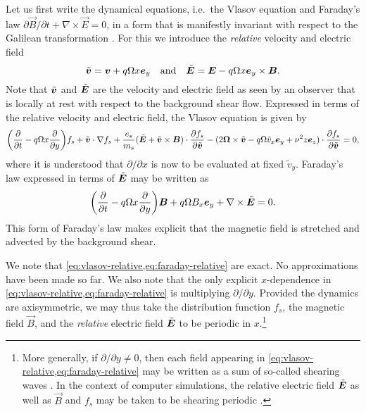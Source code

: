 \documentclass[aps,pre,notitlepage,amsmath,amssymb,amsfonts,nobibnotes,nofootinbib,superscriptaddress]{revtex4-1}
\begin{document}
Let us first write the dynamical equations, i.e.\ the Vlasov equation
 and Faraday's law
$\partial\vec{B}/\partial{}t+\nabla\times\vec{E}=0$, in a form that is
manifestly invariant with respect to the Galilean transformation
. For this we introduce the \emph{relative}
velocity and electric field
\begin{equation}
  \label{eq:relative-quantities}
  \tvec{v} = \vec{v} + q\Omega x\ey
  \quad\textrm{and}\quad
  \tvec{E} = \vec{E} - q\Omega x\ey\times\vec{B}.
\end{equation}
Note that $\tilde{\bm{v}}$ and $\tilde{\bm{E}}$ are the velocity and electric field as
seen by an observer that is locally at rest with respect to the background
shear flow. Expressed in terms of the relative velocity and electric field,
the Vlasov equation is given by
\begin{equation}
  \label{eq:vlasov-relative}
  \left(\pder{}{t} - q\Omega x\pder{}{y}\right) f_s
  + \tilde{\vec{v}}\cdot\nabla f_s
  + \frac{\qs}{m_s}(\tilde{\vec{E}} + \tilde{\vec{v}}\times\vec{B})
  \cdot\pder{f_s}{\tilde{\vec{v}}}
  - (2\vec{\Omega}\times\tvec{v} - q\Omega\tilde{v}_x\ey + \vfreq^2 z\ez)
  \cdot\pder{f_s}{\tilde{\vec{v}}} = 0,
\end{equation}
where it is understood that $\partial/\partial{}x$ is now to be evaluated at
fixed $\tilde{v}_y$. Faraday's law expressed in terms of $\tilde{\bm{E}}$ may be
written as
\begin{equation}
  \label{eq:faraday-relative}
  \left(\pder{}{t} - q\Omega x\pder{}{y}\right)
  \vec{B} + q\Omega B_x\ey + \nabla\times\tilde{\vec{E}} = 0.
\end{equation}
This form of Faraday's law makes explicit that the magnetic field is stretched
and advected by the background shear.

We note that \cref{eq:vlasov-relative,eq:faraday-relative} are exact. No
approximations have been made so far. We also note that the only explicit
$x$-dependence in \cref{eq:vlasov-relative,eq:faraday-relative} is multiplying
$\partial/\partial{}y$. Provided the dynamics are axisymmetric, we may thus
take the distribution function $f_s$, the magnetic field $\vec{B}$, and the
\emph{relative} electric field $\tilde{\bm{E}}$ to be periodic in $x$.\footnote{More
  generally, if $\partial/\partial{}y\ne0$, then each field appearing in
  \cref{eq:vlasov-relative,eq:faraday-relative} may be written as a sum of
  so-called shearing waves \citep{Thomson1887,Goldreich1965}. In the context
  of computer simulations, the relative electric field $\tilde{\bm{E}}$ as well as
  $\vec{B}$ and $f_s$ may be taken to be shearing periodic
  \citep{Lees1972,Hawley1995}.}
\end{document}
